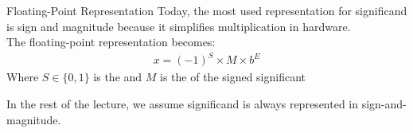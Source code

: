    \begin{parag}{Floating-Point Representation}
        Today, the most used representation for significand is sign and magnitude because it simplifies multiplication in hardware. 
        \\
        The floating-point representation becomes:
        \begin{align*}
            x = (-1)^S \times M \times b^E
        \end{align*}
        Where $S \in \{0, 1\}$ is the  and $M$ is the  of the signed significant
    \begin{framedremark}
        In the rest of the lecture, we assume significand is always represented in sign-and-magnitude.
    \end{framedremark}
    
    \end{parag}
    
